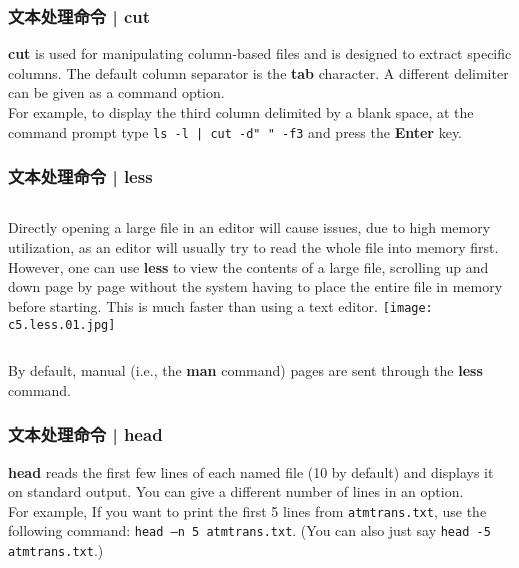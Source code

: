 \begin{frame}[fragile]
  \frametitle{文本处理命令 | cut}
  \textbf{cut} is used for manipulating column-based files and is designed to extract specific columns. The default column separator is the \textbf{tab} character. A different delimiter can be given as a command option.\\
  \vspace{0.3cm}
  For example, to display the third column delimited by a blank space, at the command prompt type \verb=ls -l | cut -d" " -f3= and press the \textbf{Enter} key.
\end{frame}

\begin{frame}
  \frametitle{文本处理命令 | less}
  \begin{columns}
  Directly opening a large file in an editor will cause issues, due to high memory utilization, as an editor will usually try to read the whole file into memory first. However, one can use \textbf{less} to view the contents of a large file, scrolling up and down page by page without the system having to place the entire file in memory before starting. This is much faster than using a text editor.
    \texttt{[image: c5.less.01.jpg]}
  \end{columns}
  By default, manual (i.e., the \textbf{man} command) pages are sent through the \textbf{less} command.
\end{frame}

\begin{frame}[fragile]
  \frametitle{文本处理命令 | head}
  \textbf{head} reads the first few lines of each named file (10 by default) and displays it on standard output. You can give a different number of lines in an option.\\
  \vspace{0.3cm}
  For example, If you want to print the first 5 lines from \verb|atmtrans.txt|, use the following command: \verb|head –n 5 atmtrans.txt|. (You can also just say \verb|head -5 atmtrans.txt|.)
\end{frame}

